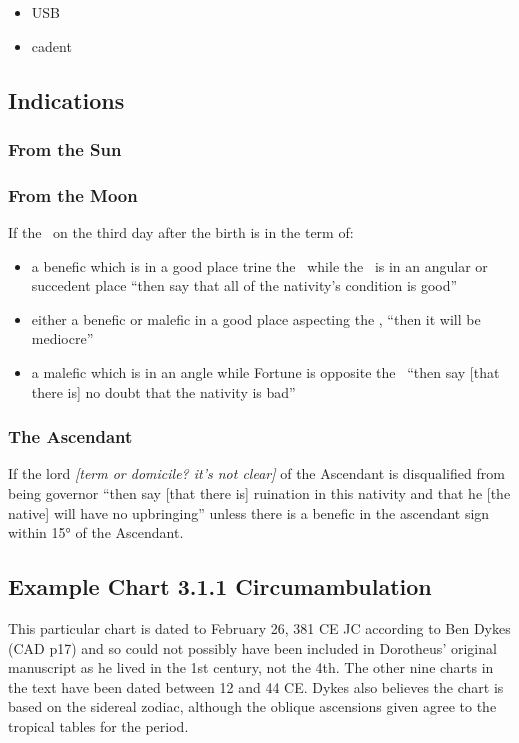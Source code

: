 \begin{itemize}[topsep=0em, itemsep=0em]
\item {} USB
\item {} cadent
\end{itemize}

\subsection{Indications}
\subsubsection{From the Sun}



\subsubsection{From the Moon}
If  the \Moon\, on the third day after the birth is in the term of:

\begin{itemize}[topsep=0em,itemsep=0em]
\item a benefic which is in a good place trine the \Moon\, while the \Moon\, is in an angular or succedent place ``then say that all of the nativity's condition is good''

\item either  a benefic or malefic in a good place aspecting the \Moon, ``then it will be mediocre''

\item a  malefic which is in an angle while Fortune is opposite the \Moon\, ``then say [that there is] no doubt that the nativity is bad''
\end{itemize}

\subsubsection{The Ascendant}
If  the lord \textsl{[term or domicile? it's not clear]} of the Ascendant is disqualified from being governor ``then say [that there is] ruination in this nativity and that he [the native] will have no upbringing'' unless there is a benefic in the ascendant sign within 15° of the Ascendant.

\subsection{Example Chart 3.1.1 Circumambulation}
\vspace{0.5em}
\begin{mdframed}[backgroundcolor=cyan!5, rightmargin=1em, leftmargin=1em]
This particular chart is dated to February 26, 381 CE JC according to Ben Dykes (CAD p17) and so could not possibly have been included in Dorotheus' original manuscript as he lived in the 1st century, not the 4th. The other nine charts in the text have been dated between 12 and 44 CE. Dykes also believes the chart is based on the sidereal zodiac, although the oblique ascensions given agree to the tropical tables for the period.
\end{mdframed}

